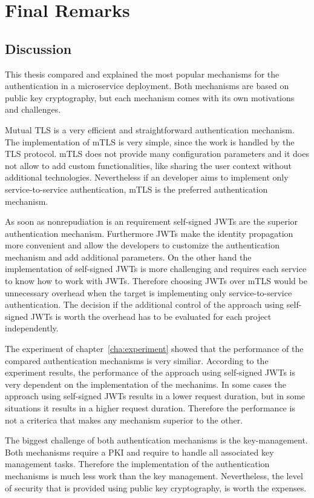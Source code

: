 \chapter{Final Remarks}
\label{cha:final_remarks}

\section{Discussion}
This thesis compared and explained the most popular mechanisms for the authentication in a microservice deployment.
Both mechanisms are based on public key cryptography, but each mechanism comes with its own motivations and challenges.

Mutual TLS is a very efficient and straightforward authentication mechanism.
The implementation of mTLS is very simple, since the work is handled by the TLS protocol.
mTLS does not provide many configuration parameters and it does not allow to add custom functionalities, like sharing the user context without additional technologies.
Nevertheless if an developer aims to implement only service-to-service authentication, mTLS is the preferred authentication mechanism.

As soon as nonrepudiation is an requirement self-signed JWTs are the superior authentication mechanism.
Furthermore JWTs make the identity propagation more convenient and allow the developers to customize the authentication mechanism and add additional parameters.
On the other hand the implementation of self-signed JWTs is more challenging and requires each service to know how to work with JWTs.
Therefore choosing JWTs over mTLS would be unnecessary overhead when the target is implementing only service-to-service authentication.
The decision if the additional control of the approach using self-signed JWTs is worth the overhead has to be evaluated for each project independently.

The experiment of chapter~\ref{cha:experiment} showed that the performance of the compared authentication mechanisms is very similiar.
According to the experiment results, the performance of the approach using self-signed JWTs is very dependent on the implementation of the mechanims.
In some cases the approach using self-signed JWTs results in a lower request duration, but in some situations it results in a higher request duration.
Therefore the performance is not a criterica that makes any mechanism superior to the other.

The biggest challenge of both authentication mechanisms is the key-management.
Both mechanisms require a PKI and require to handle all associated key management tasks.
Therefore the implementation of the authentication mechanisms is much less work than the key management.
Nevertheless, the level of security that is provided using public key cryptography, is worth the expenses.

